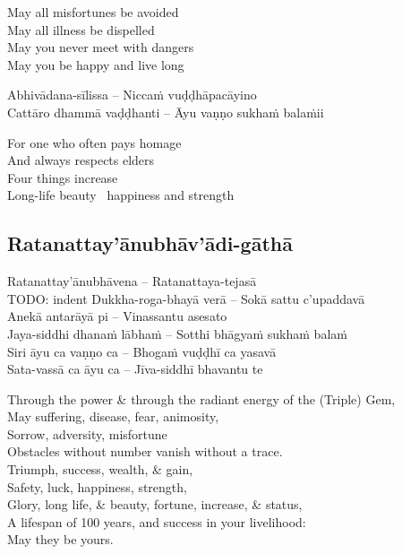 \begin{english}
  May all misfortunes be avoided\\
  May all illness be dispelled\\
  May you never meet with dangers\\
  May you be happy and live long
\end{english}

\suttaRef{[Khp A]}

\begin{twochants}
  Abhivādana-sīlissa – Niccaṁ vuḍḍhāpacāyino\\
  Cattāro dhammā vaḍḍhanti – Āyu vaṇṇo sukhaṁ balaṁii
\end{twochants}


\begin{english}
  For one who often pays homage\\
  And always respects elders\\
  Four things increase\\
  Long-life beauty \breathmark\ happiness and strength
\end{english}

\suttaRef{[Dhp 109]}

\subsection{Ratanattay'ānubhāv'ādi-gāthā}
\label{ratanattayanubhavadi-gatha}

Ratanattay'ānubhāvena – Ratanattaya-tejasā\\
TODO: indent Dukkha-roga-bhayā verā – Sokā sattu c'upaddavā\\
Anekā antarāyā pi – Vinassantu asesato\\
Jaya-siddhi dhanaṁ lābhaṁ – Sotthi bhāgyaṁ sukhaṁ balaṁ\\
Siri āyu ca vaṇṇo ca – Bhogaṁ vuḍḍhī ca yasavā\\
Sata-vassā ca āyu ca – Jīva-siddhī bhavantu te

\begin{english}
  Through the power \& through the radiant energy of the (Triple) Gem,\\
  May suffering, disease, fear, animosity,\\
  Sorrow, adversity, misfortune\\
  Obstacles without number vanish without a trace.\\
  Triumph, success, wealth, \& gain,\\
  Safety, luck, happiness, strength,\\
  Glory, long life, \& beauty, fortune, increase, \& status,\\
  A lifespan of 100 years, and success in your livelihood:\\
  May they be yours.
\end{english}

